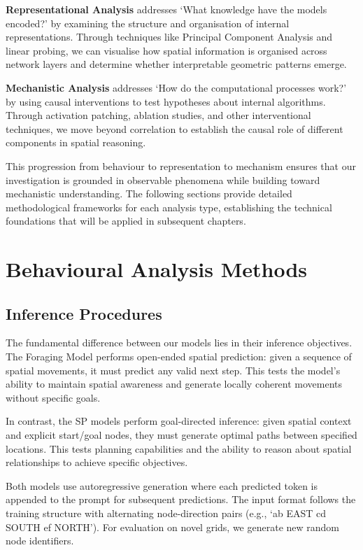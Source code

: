 \textbf{Representational Analysis} addresses `What knowledge have the models encoded?' by examining the structure and organisation of internal representations. Through techniques like Principal Component Analysis and linear probing, we can visualise how spatial information is organised across network layers and determine whether interpretable geometric patterns emerge.

\textbf{Mechanistic Analysis} addresses `How do the computational processes work?' by using causal interventions to test hypotheses about internal algorithms. Through activation patching, ablation studies, and other interventional techniques, we move beyond correlation to establish the causal role of different components in spatial reasoning.

This progression from behaviour to representation to mechanism ensures that our investigation is grounded in observable phenomena while building toward mechanistic understanding. The following sections provide detailed methodological frameworks for each analysis type, establishing the technical foundations that will be applied in subsequent chapters.

\section{Behavioural Analysis Methods}

\subsection{Inference Procedures}

The fundamental difference between our models lies in their inference objectives. The Foraging Model performs open-ended spatial prediction: given a sequence of spatial movements, it must predict any valid next step. This tests the model's ability to maintain spatial awareness and generate locally coherent movements without specific goals.

In contrast, the SP models perform goal-directed inference: given spatial context and explicit start/goal nodes, they must generate optimal paths between specified locations. This tests planning capabilities and the ability to reason about spatial relationships to achieve specific objectives.

Both models use autoregressive generation where each predicted token is appended to the prompt for subsequent predictions. The input format follows the training structure with alternating node-direction pairs (e.g., `ab EAST cd SOUTH ef NORTH'). For evaluation on novel grids, we generate new random node identifiers.

